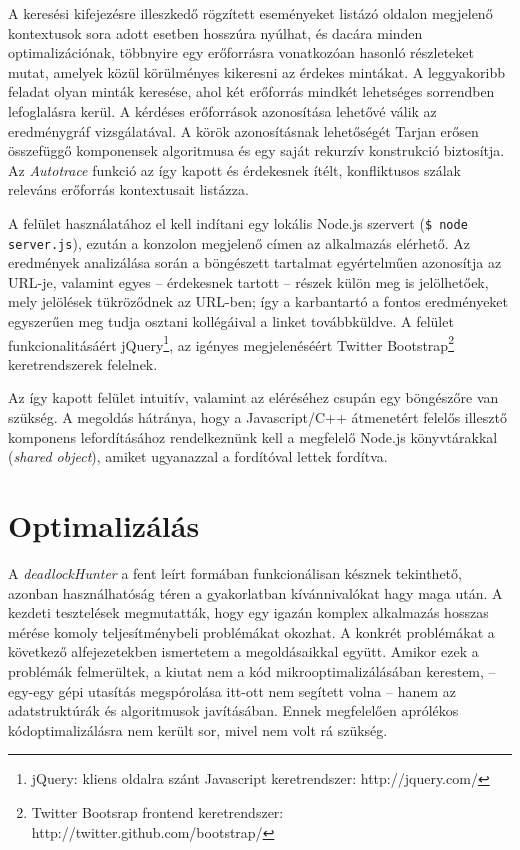     A keresési kifejezésre illeszkedő rögzített eseményeket listázó oldalon megjelenő kontextusok sora adott esetben hosszúra nyúlhat, és dacára minden optimalizációnak, többnyire egy erőforrásra vonatkozóan hasonló részleteket mutat, amelyek közül körülményes kikeresni az érdekes mintákat. A leggyakoribb feladat olyan minták keresése, ahol két erőforrás mindkét lehetséges sorrendben lefoglalásra kerül. A kérdéses erőforrások azonosítása lehetővé válik az eredménygráf vizsgálatával. A körök azonosításnak lehetőségét Tarjan erősen összefüggő komponensek algoritmusa és egy saját rekurzív konstrukció biztosítja. Az \emph{Autotrace} funkció az így kapott és érdekesnek ítélt, konfliktusos szálak releváns erőforrás kontextusait listázza.
    
    A felület használatához el kell indítani egy lokális Node.js szervert (\texttt{\$ node server.js}), ezután a konzolon megjelenő címen az alkalmazás elérhető. Az eredmények analizálása során a böngészett tartalmat egyértelműen azonosítja az URL-je, valamint egyes -- érdekesnek tartott -- részek külön meg is jelölhetőek, mely jelölések tükröződnek az URL-ben; így a karbantartó a fontos eredményeket egyszerűen meg tudja osztani kollégáival a linket továbbküldve. A felület funkcionalitásáért jQuery\footnote{jQuery: kliens oldalra szánt Javascript keretrendszer: http://jquery.com/}, az igényes megjelenéséért Twitter Bootstrap\footnote{Twitter Bootsrap frontend keretrendszer: http://twitter.github.com/bootstrap/} keretrendszerek felelnek.
    
    Az így kapott felület intuitív, valamint az eléréséhez csupán egy böngészőre van szükség. A megoldás hátránya, hogy a Javascript/C++ átmenetért felelős illesztő komponens lefordításához rendelkeznünk kell a megfelelő Node.js könyvtárakkal (\emph{shared object}), amiket ugyanazzal a fordítóval lettek fordítva.

    \section{Optimalizálás}
    A \emph{deadlockHunter} a fent leírt formában funkcionálisan késznek tekinthető, azonban használhatóság téren a gyakorlatban kívánnivalókat hagy maga után. A kezdeti tesztelések megmutatták, hogy egy igazán komplex alkalmazás hosszas mérése komoly teljesítménybeli problémákat okozhat. A konkrét problémákat a következő alfejezetekben ismertetem a megoldásaikkal együtt. Amikor ezek a problémák felmerültek, a kiutat nem a kód mikrooptimalizálásában kerestem, -- egy-egy gépi utasítás megspórolása itt-ott nem segített volna -- hanem az adatstruktúrák és algoritmusok javításában. Ennek megfelelően aprólékos kódoptimalizálásra nem került sor, mivel nem volt rá szükség.
    

